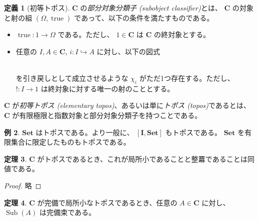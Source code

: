 \documentclass[dvipdfmx,uplatex,papersize,a4paper,10pt]{jsarticle}
\theoremstyle{definition}
\newtheorem{definition}{定義}[section]
\newtheorem{example}[definition]{例}
\newtheorem{theorem}[definition]{定理}
\DeclareMathOperator{\Sub}{Sub}
\DeclareMathOperator{\true}{true}
\begin{document}
\begin{definition}[初等トポス]
  $\mathbf{C}$ の\emph{部分対象分類子 (subobject classifier)}とは、 $\mathbf{C}$ の対象と射の組 $(\Omega, \true)$ であって、以下の条件を満たすものである。
  \begin{itemize}
    \item $\true \colon 1 \to \Omega$ である。ただし、 $1 \in \mathbf{C}$ は $\mathbf{C}$ の終対象とする。
    \item 任意の $I, A \in \mathbf{C}$, $i \colon I \hookrightarrow A$ に対し、以下の図式 \\
       \\
      を引き戻しとして成立させるような $\chi_i$ がただ1つ存在する。ただし、 $! \colon I \to 1$ は終対象に対する唯一の射のこととする。
  \end{itemize}

  $\mathbf{C}$ が\emph{初等トポス (elementary topos)}、あるいは単に\emph{トポス (topos)}であるとは、 $\mathbf{C}$ が有限極限と指数対象と部分対象分類子を持つことである。
\end{definition}

\begin{example}
  $\mathbf{Set}$ はトポスである。より一般に、 $[\mathbf{I}, \mathbf{Set}]$ もトポスである。 $\mathbf{Set}$ を有限集合に限定したものもトポスである。
\end{example}

\begin{theorem}
  $\mathbf{C}$ がトポスであるとき、これが局所小であることと整羃であることは同値である。
\end{theorem}

\begin{proof}
  略
\end{proof}

\begin{theorem}
  $\mathbf{C}$ が完備で局所小なトポスであるとき、任意の $A \in \mathbf{C}$ に対し、 $\Sub(A)$ は完備束である。
\end{theorem}
\end{document}
